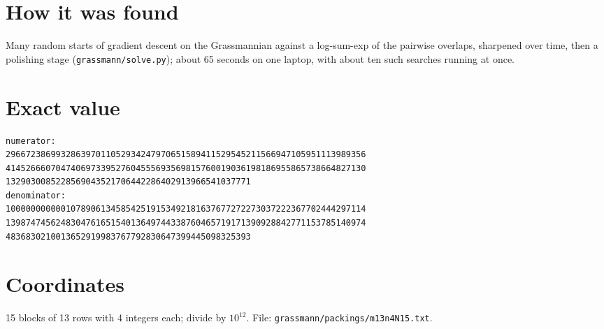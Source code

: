 \documentclass[11pt,a4paper]{article}
\begin{document}
\section{How it was found}
Many random starts of gradient descent on the Grassmannian against a log-sum-exp of the pairwise overlaps, sharpened over time, then a polishing stage (\texttt{grassmann/solve.py}); about 65 seconds on one laptop, with about ten such searches running at once.


\appendix
\section{Exact value}
{\small
\begin{verbatim}
numerator:
296672386993286397011052934247970651589411529545211566947105951113989356
414526660704740697339527604555693569815760019036198186955865738664827130
1329030085228569043521706442286402913966541037771
denominator:
100000000000107890613458542519153492181637677272273037222367702444297114
139874745624830476165154013649744338760465719171390928842771153785140974
4836830210013652919983767792830647399445098325393
\end{verbatim}}

\section{Coordinates}
15 blocks of 13 rows with 4 integers each; divide by $10^{12}$. File: \texttt{grassmann/packings/m13n4N15.txt}.
{\tiny
\begin{multicols}{3}
\end{multicols}}
\end{document}
